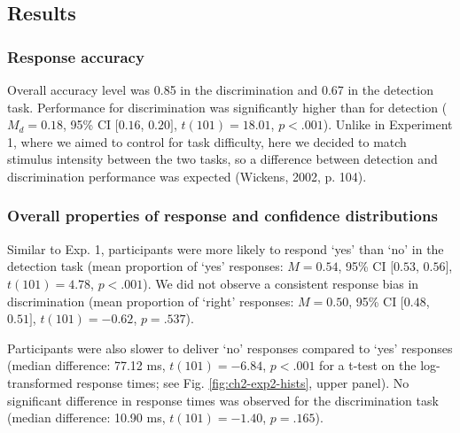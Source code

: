 \documentclass[12pt,twoside]{reedthesis}
\begin{document}
\hypertarget{results-6}{%
\subsection{Results}\label{results-6}}

\hypertarget{response-accuracy-1}{%
\subsubsection{Response accuracy}\label{response-accuracy-1}}

Overall accuracy level was 0.85 in the discrimination and 0.67 in the detection task. Performance for discrimination was significantly higher than for detection (\(M_d = 0.18\), 95\% CI \([0.16\), \(0.20]\), \(t(101) = 18.01\), \(p < .001\)). Unlike in Experiment 1, where we aimed to control for task difficulty, here we decided to match stimulus intensity between the two tasks, so a difference between detection and discrimination performance was expected (Wickens, 2002, p. 104).

\hypertarget{overall-properties-of-response-and-confidence-distributions-1}{%
\subsubsection{Overall properties of response and confidence distributions}\label{overall-properties-of-response-and-confidence-distributions-1}}

Similar to Exp. 1, participants were more likely to respond `yes' than `no' in the detection task (mean proportion of `yes' responses: \(M = 0.54\), 95\% CI \([0.53\), \(0.56]\), \(t(101) = 4.78\), \(p < .001\)). We did not observe a consistent response bias in discrimination (mean proportion of `right' responses: \(M = 0.50\), 95\% CI \([0.48\), \(0.51]\), \(t(101) = -0.62\), \(p = .537\)).

Participants were also slower to deliver `no' responses compared to `yes' responses (median difference: 77.12 ms, \(t(101) = -6.84\), \(p < .001\) for a t-test on the log-transformed response times; see Fig. \ref{fig:ch2-exp2-hists}, upper panel). No significant difference in response times was observed for the discrimination task (median difference: 10.90 ms, \(t(101) = -1.40\), \(p = .165\)).
\end{document}
